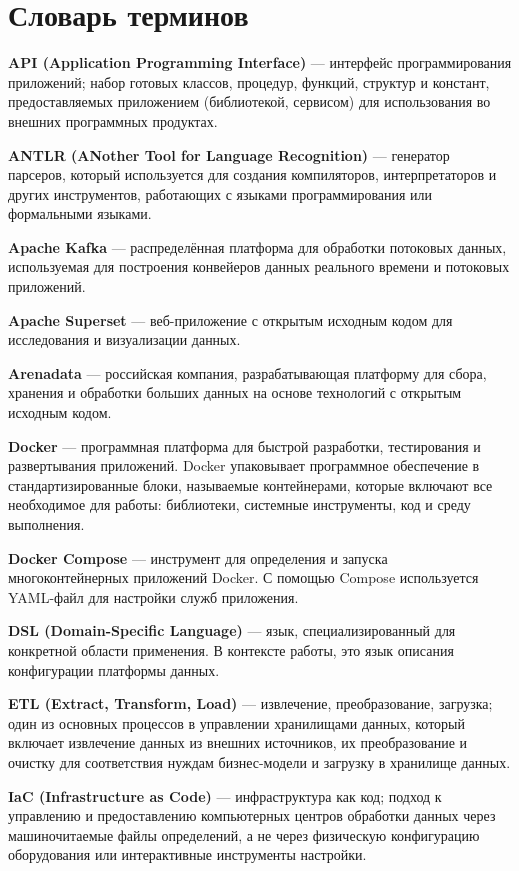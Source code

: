 \chapter*{Словарь терминов}             %

\textbf{API (Application Programming Interface)} --- интерфейс программирования приложений; набор готовых классов, процедур, функций, структур и констант, предоставляемых приложением (библиотекой, сервисом) для использования во внешних программных продуктах.

\textbf{ANTLR (ANother Tool for Language Recognition)} --- генератор парсеров, который используется для создания компиляторов, интерпретаторов и других инструментов, работающих с языками программирования или формальными языками.

\textbf{Apache Kafka} --- распределённая платформа для обработки потоковых данных, используемая для построения конвейеров данных реального времени и потоковых приложений.

\textbf{Apache Superset} --- веб-приложение с открытым исходным кодом для исследования и визуализации данных.

\textbf{Arenadata} --- российская компания, разрабатывающая платформу для сбора, хранения и обработки больших данных на основе технологий с открытым исходным кодом.

\textbf{Docker} --- программная платформа для быстрой разработки, тестирования и развертывания приложений. Docker упаковывает программное обеспечение в стандартизированные блоки, называемые контейнерами, которые включают все необходимое для работы: библиотеки, системные инструменты, код и среду выполнения.

\textbf{Docker Compose} --- инструмент для определения и запуска многоконтейнерных приложений Docker. С помощью Compose используется YAML-файл для настройки служб приложения.

\textbf{DSL (Domain-Specific Language)} --- язык, специализированный для конкретной области применения. В контексте работы, это язык описания конфигурации платформы данных.

\textbf{ETL (Extract, Transform, Load)} --- извлечение, преобразование, загрузка; один из основных процессов в управлении хранилищами данных, который включает извлечение данных из внешних источников, их преобразование и очистку для соответствия нуждам бизнес-модели и загрузку в хранилище данных.

\textbf{IaC (Infrastructure as Code)} --- инфраструктура как код; подход к управлению и предоставлению компьютерных центров обработки данных через машиночитаемые файлы определений, а не через физическую конфигурацию оборудования или интерактивные инструменты настройки.

